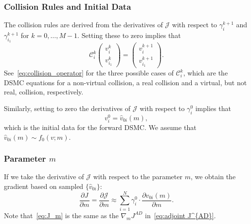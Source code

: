 \documentclass[12pt,nopreprintline]{elsarticle}
\newcommand{\cC}{\mathcal C} \newcommand{\cD}{\mathcal D}
\begin{document}
\subsubsection{Collision Rules and Initial Data}
The collision rules are derived from  the derivatives of $\mathcal J$  with   respect to $ \gamma_i^{k+1}$ and $\gamma_{i_1}^{k+1}$ for $k = 0,\ldots, M-1$. Setting these to zero implies that 
\begin{equation}  \label{eq:derived_collision}
\cC_{i}^k  \begin{pmatrix} v_i^k \\ v_{i_1}^k \end{pmatrix} = \begin{pmatrix} v_i^{k+1} \\ v_{i_1}^{k+1} \end{pmatrix} .
\end{equation}
See~\eqref{eq:collision_operator} for the three possible cases of $\cC_{i}^k$,
which are the DSMC equations for a non-virtual collision, a real collision and a virtual, but not real, collision, respectively.

Similarly,  setting to zero  the derivatives  of $\mathcal J$  with   respect to $ \gamma_i^{0}$ implies that 
 \begin{equation*} 
v_i^0  = \hat{v}_{0i}(m),
\end{equation*}
which is the initial data for the forward DSMC. We assume that $\hat{v}_{0i}(m) \sim f_0(v;m)$.



\subsubsection{Parameter $m$}
If we take the derivative of $\mathcal J$ with respect to the parameter $m$, we obtain the gradient based on sampled $\{\hat{v}_{0i}\}$:
\begin{equation}\label{eq:J_m}
 \frac{\partial J}{\partial m}  = \frac{\partial \mathcal{J}}{\partial m}  \approx  \sum_{i=1}^N   \gamma_{i}^0 \cdot  \frac{\partial \hat{v}_{0i}(m) }{\partial m}.
\end{equation}
Note that~\eqref{eq:J_m} is the same as the $ \nabla_m J^{AD}$ in~\eqref{eq:adjoint J^{AD}}.
\end{document}
